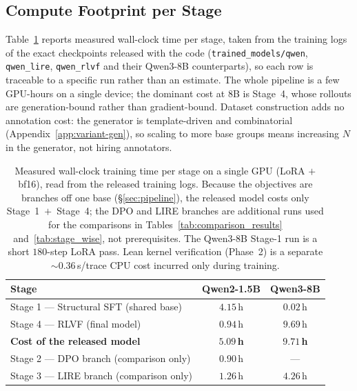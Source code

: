 \documentclass{article}
\begin{document}
\subsection{Compute Footprint per Stage}
\label{app:compute}

Table~\ref{tab:compute} reports measured wall-clock time per stage, taken from the
training logs of the exact checkpoints released with the code
(\texttt{trained\_models/qwen}, \texttt{qwen\_lire}, \texttt{qwen\_rlvf} and their
Qwen3-8B counterparts), so each row is traceable to a specific run rather than an
estimate. The whole pipeline is a few GPU-hours on a single device; the dominant
cost at $8$B is Stage~4, whose rollouts are generation-bound rather than
gradient-bound. Dataset construction adds no annotation cost: the generator is
template-driven and combinatorial (Appendix~\ref{app:variant-gen}), so scaling to
more base groups means increasing $N$ in the generator, not hiring annotators.

\begin{table}[h]
\centering\small
\caption{Measured wall-clock training time per stage on a single GPU (LoRA $+$ bf16), read from the released training logs. Because the objectives are branches off one base (\S\ref{sec:pipeline}), the released model costs only Stage~1~$+$~Stage~4; the DPO and LIRE branches are additional runs used for the comparisons in Tables~\ref{tab:comparison_results} and~\ref{tab:stage_wise}, not prerequisites. The Qwen3-8B Stage-1 run is a short $180$-step LoRA pass. Lean kernel verification (Phase~2) is a separate $\sim\!0.36$\,s/trace CPU cost incurred only during training.}
\label{tab:compute}
\begin{tabular}{lcc}
\toprule
\textbf{Stage} & \textbf{Qwen2-1.5B} & \textbf{Qwen3-8B} \\
\midrule
Stage 1 --- Structural SFT (shared base)  & $4.15$\,h & $0.02$\,h \\
Stage 4 --- \textsc{RLVF} (final model)   & $0.94$\,h & $9.69$\,h \\
\midrule
\textbf{Cost of the released model}       & $\mathbf{5.09}$\,\textbf{h} & $\mathbf{9.71}$\,\textbf{h} \\
\midrule
Stage 2 --- DPO branch (comparison only)  & $0.90$\,h & --- \\
Stage 3 --- LIRE branch (comparison only) & $1.26$\,h & $4.26$\,h \\
\bottomrule
\end{tabular}
\end{table}
\end{document}
